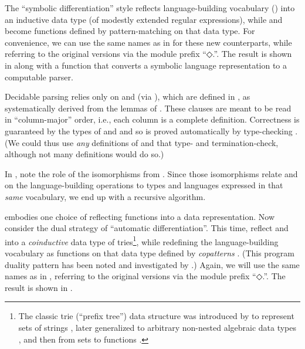 \documentclass[acmsmall,screen,timestamp,anonymous,review]{acmart}
\begin{document}
\rnc{}

\nc{}

The ``symbolic differentiation'' style reflects language-building vocabulary () into an inductive data type (of modestly extended regular expressions), while  and  become functions defined by pattern-matching on that data type.
For convenience, we can use the same names as in  for these new counterparts, while referring to the original versions via the module prefix ``{◇.}\hspace{0.05em}''.
The result is shown in  along with a function {} that converts a symbolic language representation to a computable parser.

Decidable parsing relies only on  and  (via {}), which are defined in , as systematically derived from the lemmas of .
These clauses are meant to be read in ``column-major'' order, i.e., each column is a complete definition.
Correctness is guaranteed by the types of  and  and so is proved automatically by type-checking .
(We could thus use \emph{any} definitions of  and  that type- and termination-check, although not many definitions would do so.)

In , note the role of the isomorphisms from .
Since those isomorphisms relate  and  on the language-building operations to types and languages expressed in that \emph{same} vocabulary, we end up with a recursive algorithm.

\rnc{}

\rnc{}

 embodies one choice of reflecting functions into a data representation.
Now consider the dual strategy of ``automatic differentiation''.
This time, reflect  and  into a \emph{coinductive} data type of tries\footnote{The classic trie (``prefix tree'') data structure was introduced by \citet{Thue1912Gegenseitige} to represent sets of strings \citep[Section 6.3]{Knuth1998ACP3}, later generalized to arbitrary non-nested algebraic data types \citep{Connelly1995GenTrie}, and then from sets to functions \citep{Hinze2000GGT}.}, while redefining the language-building vocabulary as functions on that data type defined by \emph{copatterns} \citep{AbelPientka2016}.
(This program duality pattern has been noted and investigated by \citet{OstermannJabs2018}.)
Again, we will use the same names as in , referring to the original versions via the module prefix ``{◇.}\hspace{0.05em}''.
The result is shown in .
\end{document}
